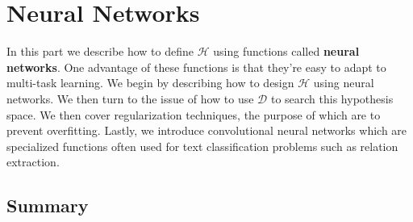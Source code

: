 \chapter{Neural Networks}
\label{neural_networks}

In this part we describe how to define $\mathcal{H}$ using functions called \textbf{neural networks}. One advantage of these functions is that they're easy to adapt to multi-task learning. We begin by describing how to design $\mathcal{H}$ using neural networks. We then turn to the issue of how to use $\mathcal{D}$ to search this hypothesis space. We then cover regularization techniques, the purpose of which are to prevent overfitting. Lastly, we introduce convolutional neural networks which are specialized functions often used for text classification problems such as relation extraction.






\section{Summary}